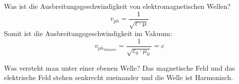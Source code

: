 \begin{karte}{Was ist die Ausbreitungsgeschwindigkeit von elektromagnetischen Wellen?}
	\Large
	\begin{equation*}
		v_{ph} = \frac{1}{\sqrt{\varepsilon \cdot \mu}}
	\end{equation*}	
	 \normalsize
	Somit ist die Ausbreitungsgeschwindigkeit im Vakuum:
	\begin{equation*}
		v_{ph_{Vakuum}} = \frac{1}{\sqrt{\varepsilon_0 \cdot \mu_0}} = c
	\end{equation*}
	
\end{karte}

\begin{karte}{Was versteht man unter einer ebenen Welle?}
	Das magnetische Feld und das elektrische Feld stehen senkrecht zueinander und die Welle ist Harmonisch.\\
\end{karte}


